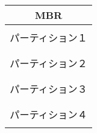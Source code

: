 \documentclass[border=1mm]{standalone}
\begin{document}
\begin{tabular}{|c|}\hline
  MBR                 \\\hline
                      \\
  パーティション１    \\
                      \\\hline
                      \\
  パーティション２    \\
                      \\\hline
                      \\
  パーティション３    \\
                      \\\hline
                      \\
  パーティション４    \\
                      \\\hline
\end{tabular}
\end{document}
